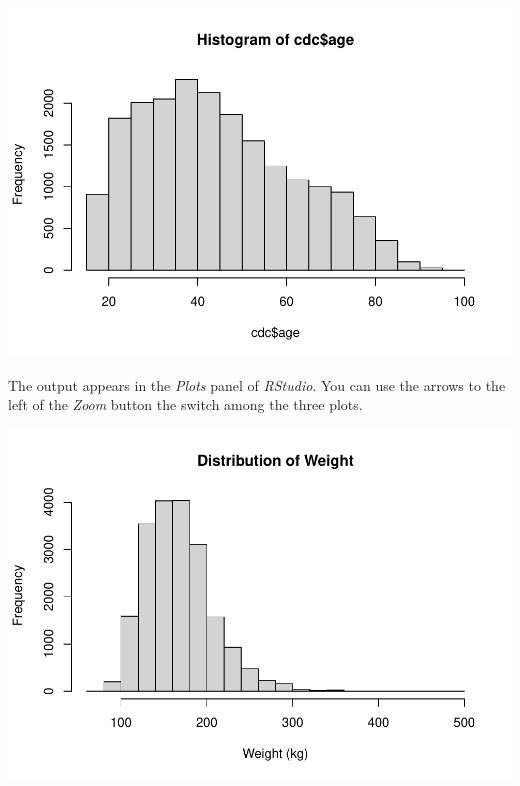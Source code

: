 \documentclass[
]{book}
\newenvironment{Shaded}{\begin{snugshade}}{\end{snugshade}}
\newcommand{\DataTypeTok}[1]{\textcolor[rgb]{0.13,0.29,0.53}{#1}}
\newcommand{\DecValTok}[1]{\textcolor[rgb]{0.00,0.00,0.81}{#1}}
\newcommand{\KeywordTok}[1]{\textcolor[rgb]{0.13,0.29,0.53}{\textbf{#1}}}
\newcommand{\NormalTok}[1]{#1}
\newcommand{\OperatorTok}[1]{\textcolor[rgb]{0.81,0.36,0.00}{\textbf{#1}}}
\newcommand{\StringTok}[1]{\textcolor[rgb]{0.31,0.60,0.02}{#1}}
\begin{document}
\includegraphics{_main_files/figure-latex/unnamed-chunk-123-3.pdf}

The output appears in the \emph{Plots} panel of \emph{RStudio}. You can use the arrows to the left of the \emph{Zoom} button the switch among the three plots.

\begin{Shaded}
\end{Shaded}

\includegraphics{_main_files/figure-latex/unnamed-chunk-124-1.pdf}
\end{document}

